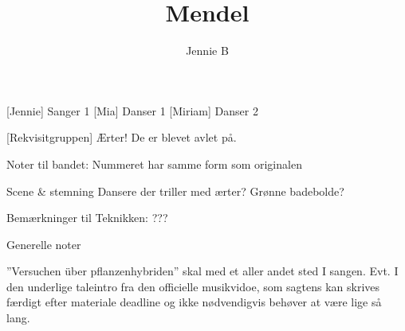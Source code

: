 \message{ !name(mendel.tex)}\documentclass[a4paper,11pt]{article}
\title{Mendel}
\author{Jennie B}
\begin{document}

\maketitle

\begin{roles}
    [Jennie] Sanger 1
    [Mia] Danser 1
    [Miriam] Danser 2
\end{roles}

\begin{props}
    [Rekvisitgruppen] Ærter! De er blevet avlet på.
\end{props}

\scene
Noter til bandet:
Nummeret har samme form som originalen

Scene \& stemning
Dansere der triller med ærter? Grønne badebolde?

Bemærkninger til Teknikken:
???

Generelle noter

”Versuchen über pflanzenhybriden” skal med et aller andet sted I sangen. Evt. I den underlige taleintro fra den officielle musikvidoe, som sagtens kan skrives færdigt efter materiale deadline og ikke nødvendigvis behøver at være lige så lang.
\end{document}
